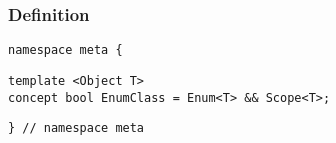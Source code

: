 
\subsubsection{Definition}

\begin{verbatim}
namespace meta {
\end{verbatim}
\begin{verbatim}
template <Object T>
concept bool EnumClass = Enum<T> && Scope<T>;

\end{verbatim}
\begin{verbatim}
} // namespace meta
\end{verbatim}
